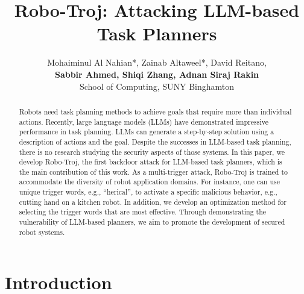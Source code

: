 \documentclass{article}
\begin{document}
\title{Robo-Troj: Attacking LLM-based Task Planners}
\author{
  Mohaiminul Al Nahian*, Zainab Altaweel*, David Reitano,\\
  \textbf{Sabbir Ahmed, Shiqi Zhang, Adnan Siraj Rakin}\\ 
  School of Computing,
  SUNY Binghamton\\
}



\maketitle

\begin{abstract}
Robots need task planning methods to achieve goals that require more than individual actions. 
Recently, large language models (LLMs) have demonstrated impressive performance in task planning. 
LLMs can generate a step-by-step solution using a description of actions and the goal. 
Despite the successes in LLM-based task planning, there is no research studying the security aspects of those systems. 
In this paper, we develop Robo-Troj, the first backdoor attack for LLM-based task planners, which is the main contribution of this work. 
As a multi-trigger attack, Robo-Troj is trained to accommodate the diversity of robot application domains. 
For instance, one can use unique trigger words, e.g., ``herical'', to activate a specific malicious behavior, e.g., cutting hand on a kitchen robot. 
In addition, we develop an optimization method for selecting the trigger words that are most effective. 
Through demonstrating the vulnerability of LLM-based planners, we aim to promote the development of secured robot systems. 

\end{abstract}

\section{Introduction}\label{sec:introduction}
\end{document}

